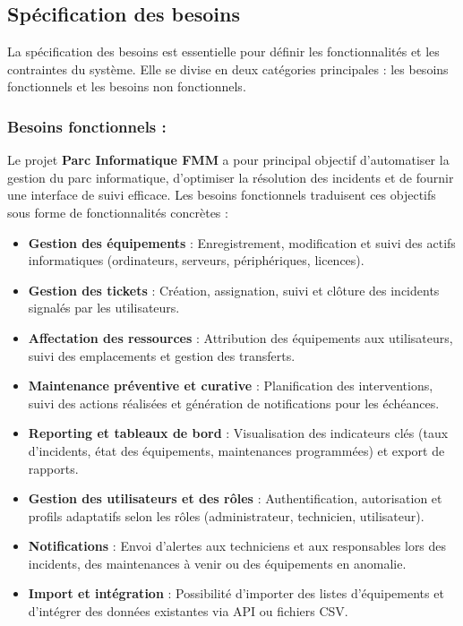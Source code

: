 \subsection{Spécification des besoins}
\label{subsec:besoins}
La spécification des besoins est essentielle pour définir les fonctionnalités et les contraintes du système. Elle se divise en deux catégories principales : les besoins fonctionnels et les besoins non fonctionnels.

\subsubsection{Besoins fonctionnels :}
\label{subsec:besoins_fonctionnels}

Le projet \textbf{Parc Informatique FMM} a pour principal objectif d’automatiser la gestion du parc informatique, d’optimiser la résolution des incidents et de fournir une interface de suivi efficace. Les besoins fonctionnels traduisent ces objectifs sous forme de fonctionnalités concrètes :

\begin{itemize}
    \item \textbf{Gestion des équipements} : Enregistrement, modification et suivi des actifs informatiques (ordinateurs, serveurs, périphériques, licences). \\
    \item \textbf{Gestion des tickets} : Création, assignation, suivi et clôture des incidents signalés par les utilisateurs. \\
    \item \textbf{Affectation des ressources} : Attribution des équipements aux utilisateurs, suivi des emplacements et gestion des transferts. \\
    \item \textbf{Maintenance préventive et curative} : Planification des interventions, suivi des actions réalisées et génération de notifications pour les échéances. \\
    \item \textbf{Reporting et tableaux de bord} : Visualisation des indicateurs clés (taux d’incidents, état des équipements, maintenances programmées) et export de rapports. \\
    \item \textbf{Gestion des utilisateurs et des rôles} : Authentification, autorisation et profils adaptatifs selon les rôles (administrateur, technicien, utilisateur). \\
    \item \textbf{Notifications} : Envoi d’alertes aux techniciens et aux responsables lors des incidents, des maintenances à venir ou des équipements en anomalie. \\
    \item \textbf{Import et intégration} : Possibilité d’importer des listes d’équipements et d’intégrer des données existantes via API ou fichiers CSV. \\
\end{itemize}

